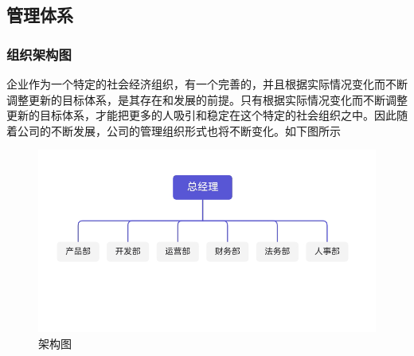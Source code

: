 \documentclass[UTF8]{ctexart}
\begin{document}
\subsection{管理体系}
\subsubsection{组织架构图}
企业作为一个特定的社会经济组织，有一个完善的，并且根据实际情况变化而不断调整更新的目标体系，是其存在和发展的前提。只有根据实际情况变化而不断调整更新的目标体系，才能把更多的人吸引和稳定在这个特定的社会组织之中。因此随着公司的不断发展，公司的管理组织形式也将不断变化。如下图所示
\begin{figure}[H]
	\centering
	\includegraphics{Picture1.png}
	\caption{架构图}

\end{figure}
\end{document}
